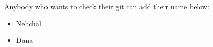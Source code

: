 \documentclass[11pt]{article}
\begin{document}
Anybody who wants to check their git can add their name below:
\begin{itemize}
    \item Nehchal
    \item Dana
\end{itemize}
\end{document}
